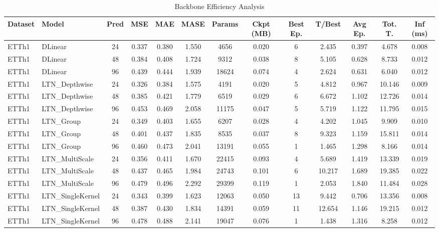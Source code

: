 \begin{table}[!htbp]
\centering
\caption{Backbone Efficiency Analysis}
\label{tab:backbone_efficiency}
\scriptsize
\begin{tabular}{llc ccc ccc ccc c}
\toprule
\textbf{Dataset} & \textbf{Model} & \textbf{Pred} & \textbf{MSE} & \textbf{MAE} & \textbf{MASE} & \textbf{Params} & \textbf{Ckpt (MB)} & \textbf{Best Ep.} & \textbf{T/Best} & \textbf{Avg Ep.} & \textbf{Tot. T.} & \textbf{Inf (ms)} \\
\midrule
ETTh1 & DLinear & 24 & 0.337 & 0.380 & 1.550 & 4656 & 0.020 & 6 & 2.435 & 0.397 & 4.678 & 0.008 \\
ETTh1 & DLinear & 48 & 0.384 & 0.408 & 1.724 & 9312 & 0.038 & 8 & 5.105 & 0.628 & 8.733 & 0.012 \\
ETTh1 & DLinear & 96 & 0.439 & 0.444 & 1.939 & 18624 & 0.074 & 4 & 2.624 & 0.631 & 6.040 & 0.012 \\
ETTh1 & LTN\_Depthwise & 24 & 0.326 & 0.384 & 1.575 & 4191 & 0.020 & 5 & 4.812 & 0.967 & 10.146 & 0.009 \\
ETTh1 & LTN\_Depthwise & 48 & 0.385 & 0.421 & 1.779 & 6519 & 0.029 & 6 & 6.672 & 1.102 & 12.726 & 0.014 \\
ETTh1 & LTN\_Depthwise & 96 & 0.453 & 0.469 & 2.058 & 11175 & 0.047 & 5 & 5.719 & 1.122 & 11.795 & 0.015 \\
ETTh1 & LTN\_Group & 24 & 0.349 & 0.403 & 1.655 & 6207 & 0.028 & 4 & 4.202 & 1.045 & 9.909 & 0.010 \\
ETTh1 & LTN\_Group & 48 & 0.401 & 0.437 & 1.835 & 8535 & 0.037 & 8 & 9.323 & 1.159 & 15.811 & 0.014 \\
ETTh1 & LTN\_Group & 96 & 0.460 & 0.473 & 2.041 & 13191 & 0.055 & 1 & 1.465 & 1.298 & 8.166 & 0.014 \\
ETTh1 & LTN\_MultiScale & 24 & 0.356 & 0.411 & 1.670 & 22415 & 0.093 & 4 & 5.689 & 1.419 & 13.339 & 0.019 \\
ETTh1 & LTN\_MultiScale & 48 & 0.437 & 0.465 & 1.984 & 24743 & 0.101 & 6 & 10.217 & 1.689 & 19.385 & 0.022 \\
ETTh1 & LTN\_MultiScale & 96 & 0.479 & 0.496 & 2.292 & 29399 & 0.119 & 1 & 2.053 & 1.840 & 11.484 & 0.028 \\
ETTh1 & LTN\_SingleKernel & 24 & 0.343 & 0.399 & 1.623 & 12063 & 0.050 & 13 & 9.442 & 0.706 & 13.356 & 0.008 \\
ETTh1 & LTN\_SingleKernel & 48 & 0.387 & 0.430 & 1.834 & 14391 & 0.059 & 11 & 12.654 & 1.146 & 19.215 & 0.012 \\
ETTh1 & LTN\_SingleKernel & 96 & 0.478 & 0.488 & 2.141 & 19047 & 0.076 & 1 & 1.438 & 1.316 & 8.258 & 0.012 \\

\end{tabular}
\end{table}

